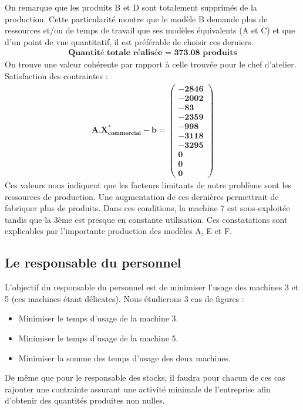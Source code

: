 \documentclass[12pt]{article}
\begin{document}
On remarque que les produits B et D sont totalement supprimés de la production. Cette particularité montre que le modèle B demande plus de ressources et/ou de temps de travail que ses modèles équivalents (A et C) et que d'un point de vue quantitatif, il est préférable de choisir ces derniers. 
\begin{align*}
\textbf{Quantité totale réalisée = 373.08 produits}
\end{align*}
On trouve une valeur cohérente par rapport à celle trouvée pour le chef d'atelier.\\
Satisfaction des contraintes : 
\begin{align*}
\boldsymbol{A.X^{*}_{commercial} - b = 
   \left (
   \begin{aligned}
      -2846 \\
      -2002 \\
      -83 \\
      -2359 \\
      -998 \\
      -3118 \\
      -3295 \\
      0 \\
      0 \\
      0
   \end{aligned}
   \right )
 } 
\end{align*}
Ces valeurs nous indiquent que les facteurs limitants de notre problème sont les ressources de production. Une augmentation de ces dernières permettrait de fabriquer plus de produits.
Dans ces conditions, la machine 7 est sous-exploitée tandis que la 3ème est presque en constante utilisation. Ces constatations sont explicables par l'importante production des modèles A, E et F. 
\subsection{Le responsable du personnel}
L'objectif du responsable du personnel est de minimiser l'usage des machines 3 et 5 (ces machines étant délicates).
Nous étudierons 3 cas de figures : 
\begin{itemize}
\item Minimiser le temps d'usage de la machine 3.
\item Minimiser le temps d'usage de la machine 5.
\item Minimiser la somme des temps d'usage des deux machines.
\end{itemize}
De même que pour le responsable des stocks, il faudra pour chacun de ces cas rajouter une contrainte assurant une  activité minimale de l'entreprise afin d'obtenir des quantités produites non nulles.\\ 
\end{document}
